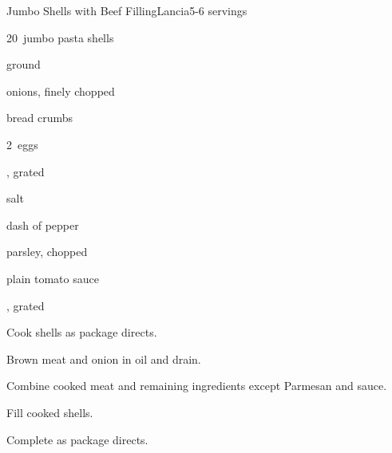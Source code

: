 \begin{recipe}{Jumbo Shells with Beef Filling\FIXME}{Lancia}{5-6 servings}

\begin{ingredients}
\item 20~jumbo pasta shells
\item {} ground 
\item \C{\quarter} onions, finely chopped
\item \C{\quarter} bread crumbs
\item 2~eggs
\item {} , grated
\item \tp{\half} salt
\item dash of pepper
\item {} parsley, chopped
\item \C{3\half} plain tomato sauce
\item \C{\quarter} , grated
\end{ingredients}

\begin{directions}
\item Cook shells as package directs.
\item Brown meat and onion in oil and drain.
\item Combine cooked meat and remaining ingredients except Parmesan and sauce.
\item Fill cooked shells.
\item Complete as package directs.
\end{directions}

\end{recipe}
